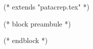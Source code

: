 
(* extends "patacrep.tex" *)

(* block preambule *)
\usepackage{venturisold}
\renewcommand{\printchord}[1]{\mdseries\ttfamily\upshape#1}

\usepackage{licence}
(* endblock *)

